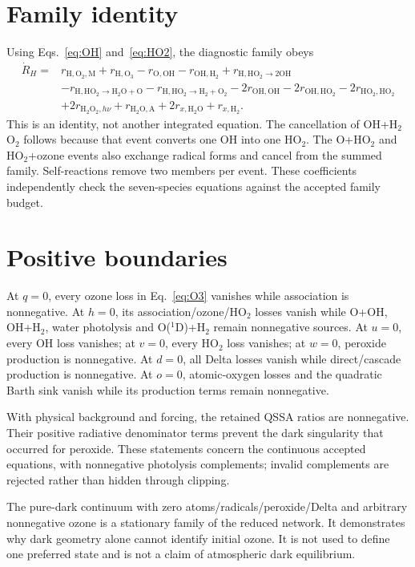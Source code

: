 \section{Family identity}
Using Eqs.~\eqref{eq:OH} and~\eqref{eq:HO2}, the diagnostic family obeys
\begin{align}
\dot R_H={}&r_{\mathrm{H,O_2,M}}+r_{\mathrm{H,O_3}}-r_{\mathrm{O,OH}}-r_{\mathrm{OH,H_2}}
+r_{\mathrm{H,HO_2\to2OH}}\nonumber\\
&-r_{\mathrm{H,HO_2\to H_2O+O}}-r_{\mathrm{H,HO_2\to H_2+O_2}}
-2r_{\mathrm{OH,OH}}-2r_{\mathrm{OH,HO_2}}-2r_{\mathrm{HO_2,HO_2}}\nonumber\\
&+2r_{\mathrm{H_2O_2},h\nu}+r_{\mathrm{H_2O,A}}+2r_{x,\mathrm{H_2O}}+r_{x,\mathrm{H_2}}.
\label{eq:Rbudget}
\end{align}
This is an identity, not another integrated equation. The cancellation of OH+H$_2$O$_2$ follows because that event converts one OH into one HO$_2$. The O+HO$_2$ and HO$_2$+ozone events also exchange radical forms and cancel from the summed family. Self-reactions remove two members per event. These coefficients independently check the seven-species equations against the accepted family budget.

\section{Positive boundaries}
At $q=0$, every ozone loss in Eq.~\eqref{eq:O3} vanishes while association is nonnegative. At $h=0$, its association/ozone/HO$_2$ losses vanish while O+OH, OH+H$_2$, water photolysis and O($^1$D)+H$_2$ remain nonnegative sources. At $u=0$, every OH loss vanishes; at $v=0$, every HO$_2$ loss vanishes; at $w=0$, peroxide production is nonnegative. At $d=0$, all Delta losses vanish while direct/cascade production is nonnegative. At $o=0$, atomic-oxygen losses and the quadratic Barth sink vanish while its production terms remain nonnegative.

With physical background and forcing, the retained QSSA ratios are nonnegative. Their positive radiative denominator terms prevent the dark singularity that occurred for peroxide. These statements concern the continuous accepted equations, with nonnegative photolysis complements; invalid complements are rejected rather than hidden through clipping.

The pure-dark continuum with zero atoms/radicals/peroxide/Delta and arbitrary nonnegative ozone is a stationary family of the reduced network. It demonstrates why dark geometry alone cannot identify initial ozone. It is not used to define one preferred state and is not a claim of atmospheric dark equilibrium.

